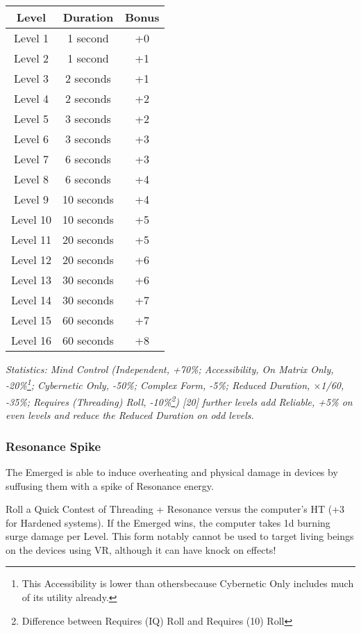 \begin{multicols*}{3}
	\begin{center}
		\begin{tabular}{|c|c|c|}
			\hline
			Level & Duration & Bonus\\
			\hline
			\hline
			Level 1 & 1 second & +0 \\
			Level 2 & 1 second & +1 \\
			Level 3 & 2 seconds & +1 \\
			Level 4 & 2 seconds & +2 \\
			Level 5 & 3 seconds & +2 \\
			Level 6 & 3 seconds & +3 \\
			Level 7 & 6 seconds & +3 \\
			Level 8 & 6 seconds & +4 \\
			Level 9 & 10 seconds & +4 \\
			Level 10 & 10 seconds & +5 \\
			Level 11 & 20 seconds & +5 \\
			Level 12 & 20 seconds & +6 \\
			Level 13 & 30 seconds & +6 \\
			Level 14 & 30 seconds & +7 \\
			Level 15 & 60 seconds & +7 \\
			Level 16 & 60 seconds & +8 \\
			\hline
		\end{tabular}
	\end{center}

	\textcolor{OliveGreen}{\textit{Statistics: Mind Control (Independent, +70\%; Accessibility, On Matrix Only, -20\%\footnote{This Accessibility is lower than othersbecause Cybernetic Only includes much of its utility already.}; Cybernetic Only, -50\%; Complex Form, -5\%; Reduced Duration, \(\times\)1/60, -35\%; Requires (Threading) Roll, -10\%\footnote{Difference between Requires (IQ) Roll and Requires (10) Roll}) [20] further levels add Reliable, +5\% on even levels and reduce the Reduced Duration on odd levels. }}
	
	\subsubsection*{Resonance Spike}\label{resonance_spike}
	
	The Emerged is able to induce overheating and physical damage in devices by suffusing them with a spike of Resonance energy.
	
	Roll a Quick Contest of Threading + Resonance versus the computer's HT (+3 for Hardened systems). If the Emerged wins, the computer takes 1d burning surge damage per Level. This form notably cannot be used to target living beings on the devices using VR, although it can have knock on effects!
	

\end{multicols*}
